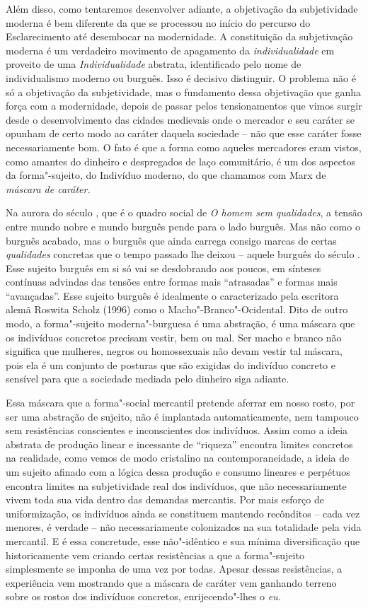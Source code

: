 Além disso, como tentaremos desenvolver adiante, a objetivação da
subjetividade moderna é bem diferente da que se processou no início do
percurso do Esclarecimento até desembocar na modernidade. A constituição
da subjetivação moderna é um verdadeiro movimento de apagamento da
\emph{individualidade} em proveito de uma \emph{Individualidade}
abstrata, identificado pelo nome de individualismo moderno ou burguês.
Isso é decisivo distinguir. O problema não é só a objetivação da
subjetividade, mas o fundamento dessa objetivação que ganha força com a
modernidade, depois de passar pelos tensionamentos que vimos surgir
desde o desenvolvimento das cidades medievais onde o mercador e seu
caráter se opunham de certo modo ao caráter daquela sociedade -- não que
esse caráter fosse necessariamente bom. O fato é que a forma como
aqueles mercadores eram vistos, como amantes do dinheiro e despregados
de laço comunitário, é um dos aspectos da forma"-sujeito, do Indivíduo
moderno, do que chamamos com Marx de \emph{máscara de caráter.}

Na aurora do século , que é o quadro social de \emph{O homem sem
qualidades}, a tensão entre mundo nobre e mundo burguês pende para o
lado burguês. Mas não como o burguês acabado, mas o burguês que ainda
carrega consigo marcas de certas \emph{qualidades} concretas que o tempo
passado lhe deixou -- aquele burguês do século . Esse sujeito burguês
em si só vai se desdobrando aos poucos, em sínteses contínuas advindas
das tensões entre formas mais ``atrasadas'' e formas mais ``avançadas''.
Esse sujeito burguês é idealmente o caracterizado pela escritora alemã
Roswita Scholz (1996) como o Macho"-Branco"-Ocidental. Dito de outro modo,
a forma"-sujeito moderna"-burguesa é uma abstração, é uma máscara que os
indivíduos concretos precisam vestir, bem ou mal. Ser macho e branco não
significa que mulheres, negros ou homossexuais não devam vestir tal
máscara, pois ela é um conjunto de posturas que são exigidas do
indivíduo concreto e sensível para que a sociedade mediada pelo dinheiro
siga adiante.

Essa máscara que a forma"-social mercantil pretende aferrar em nosso
rosto, por ser uma abstração de sujeito, não é implantada
automaticamente, nem tampouco sem resistências conscientes e
inconscientes dos indivíduos. Assim como a ideia abstrata de produção
linear e incessante de ``riqueza'' encontra limites concretos na
realidade, como vemos de modo cristalino na contemporaneidade, a ideia
de um sujeito afinado com a lógica dessa produção e consumo lineares e
perpétuos encontra limites na subjetividade real dos indivíduos, que não
necessariamente vivem toda sua vida dentro das demandas mercantis. Por
mais esforço de uniformização, os indivíduos ainda se constituem
mantendo recônditos -- cada vez menores, é verdade -- não
necessariamente colonizados na sua totalidade pela vida mercantil. E é
essa concretude, esse não"-idêntico e sua mínima diversificação que
historicamente vem criando certas resistências a que a forma"-sujeito
simplesmente se imponha de uma vez por todas. Apesar dessas
resistências, a experiência vem mostrando que a máscara de caráter vem
ganhando terreno sobre os rostos dos indivíduos concretos,
enrijecendo"-lhes o \emph{eu.}

